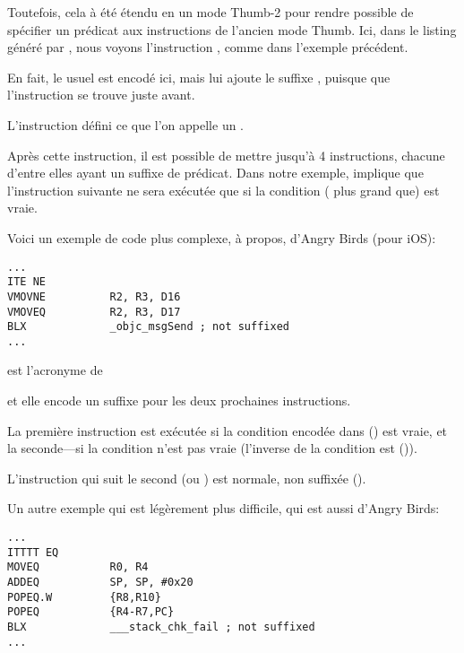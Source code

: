 
Toutefois, cela à été étendu en un mode Thumb-2 pour rendre possible de spécifier
un prédicat aux instructions de l'ancien mode Thumb.
Ici, dans le listing généré par \IDA, nous voyons l'instruction , comme
dans l'exemple précédent.

En fait, le  usuel est encodé ici, mais \IDA lui ajoute le suffixe ,
puisque que l'instruction  se trouve juste avant.

\label{ARM_Thumb_IT}
L'instruction  défini ce que l'on appelle un .

Après cette instruction, il est possible de mettre jusqu'à 4 instructions, chacune
d'entre elles ayant un suffixe de prédicat.
Dans notre exemple,  implique que l'instruction suivante ne sera exécutée
que si la condition  ( plus grand que) est vraie.

Voici un exemple de code plus complexe, à propos, d'Angry Birds (pour iOS):

\begin{lstlisting}[caption=Angry Birds Classic,style=customasmARM]
...
ITE NE
VMOVNE          R2, R3, D16
VMOVEQ          R2, R3, D17
BLX             _objc_msgSend ; not suffixed
...
\end{lstlisting}

 est l'acronyme de 

et elle encode un suffixe pour les deux prochaines instructions.

La première instruction est exécutée si la condition encodée dans  ()
est vraie, et la seconde---si la condition n'est pas vraie (l'inverse de la condition
 est  ()).

L'instruction qui suit le second  (ou ) est normale, non suffixée
().

Un autre exemple qui est légèrement plus difficile, qui est aussi d'Angry Birds:

\begin{lstlisting}[caption=Angry Birds Classic,style=customasmARM]
...
ITTTT EQ
MOVEQ           R0, R4
ADDEQ           SP, SP, #0x20
POPEQ.W         {R8,R10}
POPEQ           {R4-R7,PC}
BLX             ___stack_chk_fail ; not suffixed
...
\end{lstlisting}

